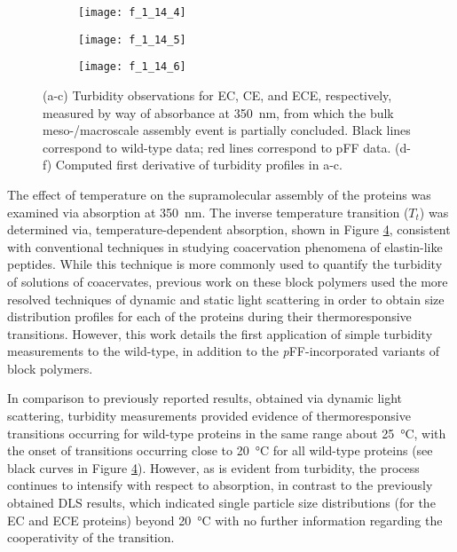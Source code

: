 \begin{refsection}
\begin{figure}[h!]
    \begin{subfigure}[b]{0.32\textwidth}
        \texttt{[image: f\_1\_14\_4]}
        \caption{}
        \label{fig:LCST_deriv_ECpFF}
    \end{subfigure}
    \begin{subfigure}[b]{0.32\textwidth}
        \texttt{[image: f\_1\_14\_5]}
        \caption{}
        \label{fig:LCST_deriv_CEpFF}
    \end{subfigure}
    \begin{subfigure}[b]{0.32\textwidth}
        \texttt{[image: f\_1\_14\_6]}
        \caption{}
        \label{fig:LCST_deriv_ECEpFF}
    \end{subfigure}
    \caption{(a-c) Turbidity observations for EC, CE, and ECE, respectively,
        measured by way of absorbance at \SI{350}{\nm}, from which the bulk
        meso-/macroscale assembly event is partially concluded. Black lines
        correspond to wild-type data; red lines correspond to pFF data. (d-f)
    Computed first derivative of turbidity profiles in a-c.}
    \label{fig:lcst}
\end{figure}
The effect of temperature on the supramolecular assembly of the proteins was
examined via absorption at \SI{350}{\nm}. The inverse temperature transition
(${T_t}$) was determined via, temperature-dependent absorption, shown in Figure
\ref{fig:lcst}, consistent with conventional techniques in studying coacervation
phenomena of elastin-like peptides.\cite{Urry1985} While this technique is more
commonly used to quantify the turbidity of solutions of coacervates, previous
work on these block polymers used the more resolved techniques of dynamic and
static light scattering in order to obtain size distribution profiles for each
of the proteins during their thermoresponsive transitions. However, this work
details the first application of simple turbidity measurements to the
wild-type, in addition to the \emph{p}FF-incorporated variants of block polymers.

In comparison to previously reported results, obtained via dynamic light
scattering, turbidity measurements provided evidence of thermoresponsive
transitions occurring for wild-type proteins in the same range about
\SI{25}{\celsius}, with the onset of transitions occurring close to
\SI{20}{\celsius} for all wild-type proteins (see black curves in Figure 
\ref{fig:lcst}). However, as is evident from turbidity, the process continues
to intensify with respect to absorption, in contrast to the previously obtained
DLS results, which indicated single particle size distributions (for the EC and
ECE proteins) beyond \SI{20}{\celsius} with no further information regarding the
cooperativity of the transition.


\end{refsection}

